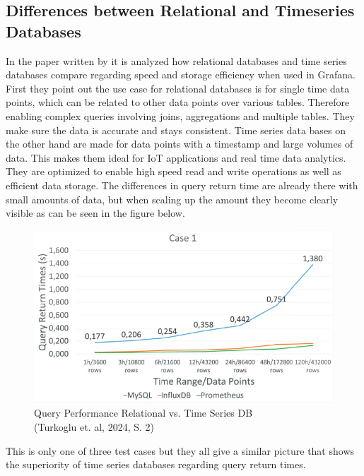 \subsection{Differences between Relational and Timeseries Databases}
In the paper written by \cite{turkogluComparisonTimeSeries2024} it is analyzed how relational databases and time series databases compare regarding speed and storage efficiency when used in Grafana.
First they point out the use case for relational databases is for single time data points, which can be related to other data points over various tables. Therefore enabling complex queries involving joins, aggregations and multiple tables. They make sure the data is accurate and stays consistent.
Time series data bases on the other hand are made for data points with a timestamp and large volumes of data. This makes them ideal for IoT applications and real time data analytics. They are optimized to enable high speed read and write operations as well as efficient data storage.
The differences in query return time are already there with small amounts of data, but when scaling up the amount they become clearly visible as can be seen in the figure below.
\begin{figure}[H]
	\includegraphics[width=\linewidth]{pic/query-performance-db.png}
	\caption{Query Performance Relational vs. Time Series DB \\ (Turkoglu et. al, 2024, S. 2)}
	\label{fig:query-performance-db}
\end{figure}
This is only one of three test cases but they all give a similar picture that shows the superiority of time series databases regarding query return times.


